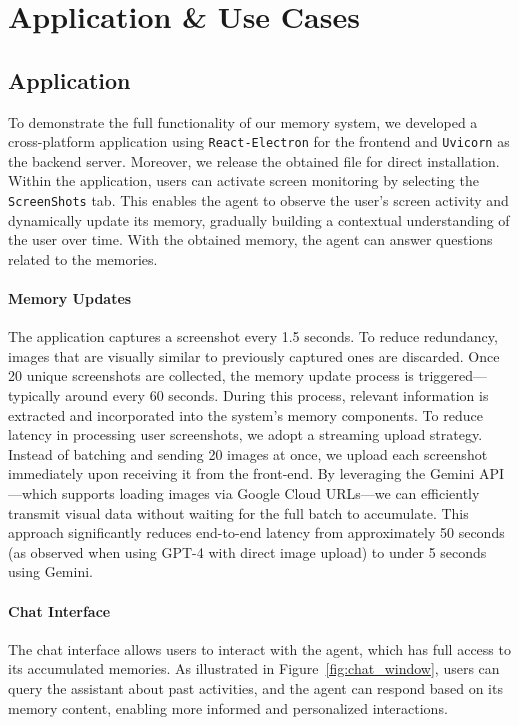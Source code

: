 \section{Application \& Use Cases}

\subsection{\ours Application}

To demonstrate the full functionality of our memory system, we developed a cross-platform application using \texttt{React-Electron} for the frontend and \texttt{Uvicorn} as the backend server. Moreover, we release the obtained file for direct installation. Within the application, users can activate screen monitoring by selecting the \texttt{ScreenShots} tab. This enables the agent to observe the user’s screen activity and dynamically update its memory, gradually building a contextual understanding of the user over time. With the obtained memory, the agent can answer questions related to the memories.

\paragraph{Memory Updates}
The application captures a screenshot every 1.5 seconds. To reduce redundancy, images that are visually similar to previously captured ones are discarded. Once 20 unique screenshots are collected, the memory update process is triggered—typically around every 60 seconds. During this process, relevant information is extracted and incorporated into the system's memory components. To reduce latency in processing user screenshots, we adopt a streaming upload strategy. Instead of batching and sending 20 images at once, we upload each screenshot immediately upon receiving it from the front-end. By leveraging the Gemini API—which supports loading images via Google Cloud URLs—we can efficiently transmit visual data without waiting for the full batch to accumulate. This approach significantly reduces end-to-end latency from approximately 50 seconds (as observed when using GPT-4 with direct image upload) to under 5 seconds using Gemini.


\paragraph{Chat Interface}
The chat interface allows users to interact with the agent, which has full access to its accumulated memories. As illustrated in Figure~\ref{fig:chat_window}, users can query the assistant about past activities, and the agent can respond based on its memory content, enabling more informed and personalized interactions.


